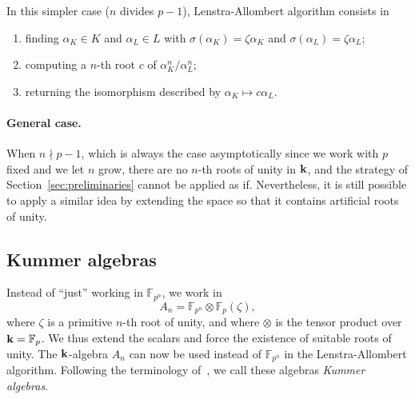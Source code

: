 In this simpler case ($n$ divides $p-1$), Lenstra-Allombert algorithm consists
in
\begin{enumerate}
  \item finding $\alpha_K\in K$ and $\alpha_L\in L$ with
    $\sigma(\alpha_K)=\zeta\alpha_K$ and $\sigma(\alpha_L)=\zeta\alpha_L$;
  \item computing a $n$-th root $c$ of $\alpha_K^n/\alpha_L^n$;
  \item returning the isomorphism described by $\alpha_K\mapsto c\alpha_L$.
\end{enumerate}

\paragraph{General case.} When $n\nmid p-1$, which is always
the case asymptotically since we work with $p$ fixed and we let $n$ grow, there
are no $n$-th roots of unity in $\mathbf{k}$, and the strategy of
Section~\ref{sec:preliminaries} cannot be applied as if. Nevertheless, it is
still possible to apply a similar idea by extending the space so that it
contains artificial roots of unity.

\subsection{Kummer algebras}
\label{sec:kummer-algebras}

%

Instead of ``just'' working in $\mathbb{F}_{p^n}$, we work in
\[
  A_n = \mathbb{F}_{p^n}\otimes \mathbb{F}_p(\zeta),
\]
where $\zeta$ is a primitive $n$-th root of unity, and where $\otimes$ is the tensor
product over $\mathbf{k}=\mathbb{F}_p$. We thus extend the scalars and force the existence of
suitable roots of unity. The $\mathbf{k}$-algebra $A_n$ can now be used instead of
$\mathbb{F}_{p^n}$ in the Lenstra-Allombert algorithm. Following the terminology
of~\cite{DRR19}, we call these algebras \emph{Kummer algebras}.

